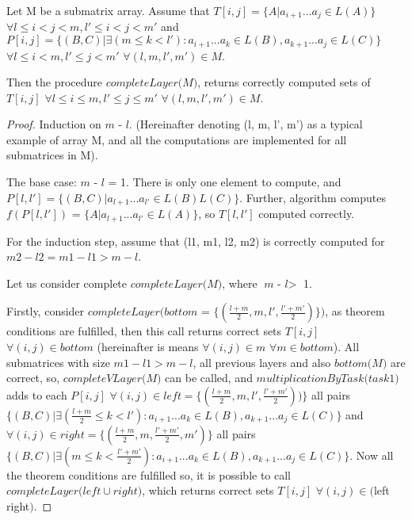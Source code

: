 \documentclass[runningheads]{llncs}
\begin{document}
\begin{theorem}
Let M be a submatrix array. Assume that $T[i, j] =  \{ A |  a_{i + 1}...a_{j} \in L(A)\}$ $\forall l \leq i < j < m,  l' \leq i < j < m'$ and $P[i, j] =  \{ (B, C) |\exists (m \le k < l'): a_{i + 1}...a_{k} \in L(B), a_{k + 1}...a_{j} \in L(C)\}$ $\forall l \leq i < m,  l' \leq j < m'$ $\forall (l, m, l', m') \in M$.

Then the procedure $\textit{completeLayer(M)}$, returns correctly computed sets of $T[i, j]$ $\forall l \leq i \le m,  l' \leq j \le m'$ $\forall (l, m, l', m') \in M$. 
\end{theorem}
%
%
\begin{proof}
Induction on $\textit{m - l}$. (Hereinafter denoting (l, m, l', m') as a typical example of array M, and all the computations are implemented for all submatrices in M).

The base case: $\textit{m - l}$ = 1. There is only one element to compute, and $P[l, l'] =  \{ (B, C) |  a_{l + 1}...a_{l'} \in L(B)L(C)\}$. Further, algorithm computes $f(P[l, l'])$ = \linebreak $\{ A |  a_{l + 1}...a_{l'} \in L(A)\}$, so $T[l, l']$ computed correctly.

For the induction step, assume that (l1, m1, l2, m2) is correctly computed for $m2 - l2 = m1 - l1 > m - l$.

Let us consider complete $\textit{completeLayer(M)}$, where $\textit{m - l} >$ 1.

Firstly, consider $\textit{completeLayer(bottom = \{$(\frac{l+m}{2}, m, l', \frac{l'+m'}{2})$\})}$, as theorem conditions are fulfilled, then this call returns correct sets $T[i, j]$ $\forall (i, j) \in bottom$ (hereinafter is means $\forall (i, j) \in m$ $\forall m \in bottom$). All submatrices with size $ m1 - l1 > m - l$, all previous layers and also $\textit{bottom(M)}$ are correct, so, $\textit{completeVLayer(M)}$ can be called, and $\textit{multiplicationByTask(task1)}$ adds to each $P[i, j]$ $\forall (i, j) \in left = \{(\frac{l+m}{2}, m, l', \frac{l'+m'}{2}))\}$ all pairs $\{ (B, C) |\exists (\frac{l+m}{2} \le k < l'): a_{i + 1}...a_{k} \in L(B), a_{k + 1}...a_{j} \in L(C)\}$ and $\forall (i, j) \in right = \{(\frac{l+m}{2}, m, \frac{l'+m'}{2}, m')\}$ all pairs $\{ (B, C) |\exists (m \le k < \frac{l'+m'}{2}): a_{i + 1}...a_{k} \in L(B), a_{k + 1}...a_{j} \in L(C)\}$. Now all the theorem conditions are fulfilled so, it is possible to call $\textit{completeLayer($left \cup right$)}$, which returns correct sets $T[i, j]$ $\forall (i, j) \in ($left \cup right$)$. 


\end{proof}
\end{document}
